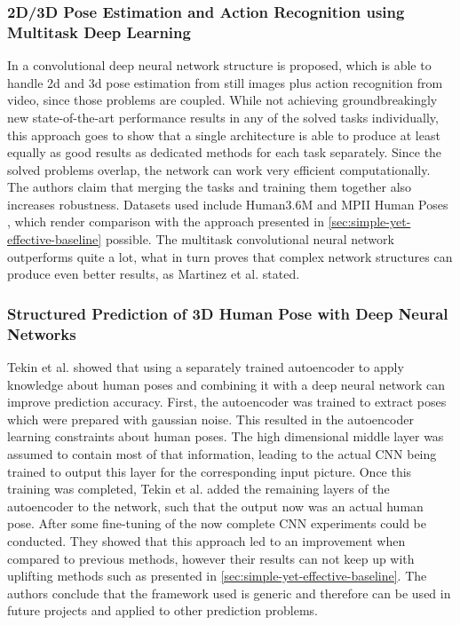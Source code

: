 \subsubsection{2D/3D Pose Estimation and Action Recognition using Multitask Deep Learning}
In \cite{Luvizon2018} a convolutional deep neural network structure is proposed, which is able to handle 2d and 3d pose estimation from still images plus action recognition from video, since those problems are coupled. While not achieving groundbreakingly new state-of-the-art performance results in any of the solved tasks individually, this approach goes to show that a single architecture is able to produce at least equally as good results as dedicated methods for each task separately. Since the solved problems overlap, the network can work very efficient computationally. The authors claim that merging the tasks and training them together also increases robustness. Datasets used include Human3.6M \cite{H3.6M} and MPII Human Poses \cite{andriluka14cvpr}, which render comparison with the approach presented in \autoref{sec:simple-yet-effective-baseline} possible. The multitask convolutional neural network outperforms \cite{Martinez_2017_ICCV} quite a lot, what in turn proves that complex network structures can produce even better results, as Martinez et al. stated.
\subsubsection{Structured Prediction of 3D Human Pose with Deep Neural Networks}
Tekin et al. \cite{Tekin2016} showed that using a separately trained autoencoder to apply knowledge about human poses and combining it with a deep neural network can improve prediction accuracy. First, the autoencoder was trained to extract poses which were prepared with gaussian noise. This resulted in the autoencoder learning constraints about human poses. The high dimensional middle layer was assumed to contain most of that information, leading to the actual CNN being trained to output this layer for the corresponding input picture. Once this training was completed, Tekin et al. added the remaining layers of the autoencoder to the network, such that the output now was an actual human pose. After some fine-tuning of the now complete CNN experiments could be conducted.
They showed that this approach led to an improvement when compared to previous methods, however their results can not keep up with uplifting methods such as presented in \autoref{sec:simple-yet-effective-baseline}. The authors conclude that the framework used is generic and therefore can be used in future projects and applied to other prediction problems.


